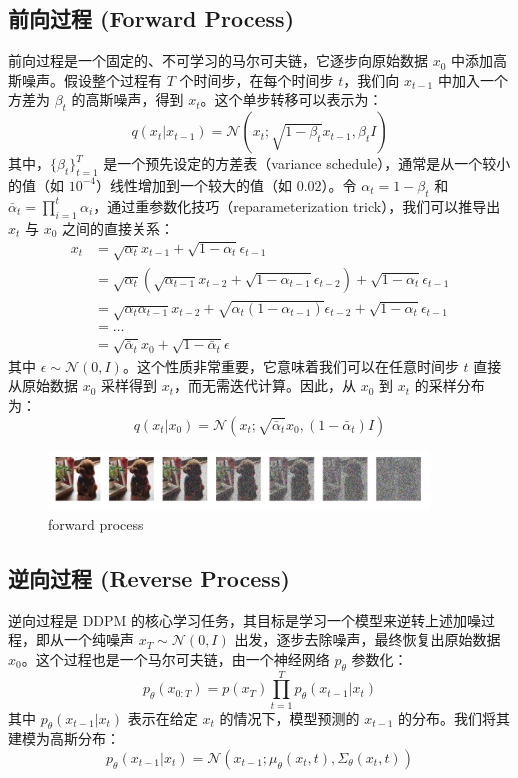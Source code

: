 \documentclass{ctexart}
\begin{document}
\subsection{前向过程 (Forward Process)}
\noindent
前向过程是一个固定的、不可学习的马尔可夫链，它逐步向原始数据 $x_0$ 中添加高斯噪声。假设整个过程有 $T$ 个时间步，在每个时间步 $t$，我们向 $x_{t-1}$ 中加入一个方差为 $\beta_t$ 的高斯噪声，得到 $x_t$。这个单步转移可以表示为：
$$ q(x_t | x_{t-1}) = \mathcal{N}(x_t; \sqrt{1 - \beta_t} x_{t-1}, \beta_t I) $$
其中，$\{\beta_t\}_{t=1}^T$ 是一个预先设定的方差表（variance schedule），通常是从一个较小的值（如 $10^{-4}$）线性增加到一个较大的值（如 $0.02$）。令 $\alpha_t = 1 - \beta_t$ 和 $\bar{\alpha}_t = \prod_{i=1}^{t} \alpha_i$，通过重参数化技巧（reparameterization trick），我们可以推导出 $x_t$ 与 $x_0$ 之间的直接关系：
\begin{align*}
    x_t &= \sqrt{\alpha_t}x_{t-1} + \sqrt{1-\alpha_t}\epsilon_{t-1} \\
    &= \sqrt{\alpha_t}(\sqrt{\alpha_{t-1}}x_{t-2} + \sqrt{1-\alpha_{t-1}}\epsilon_{t-2}) + \sqrt{1-\alpha_t}\epsilon_{t-1} \\
    &= \sqrt{\alpha_t\alpha_{t-1}}x_{t-2} + \sqrt{\alpha_t(1-\alpha_{t-1})}\epsilon_{t-2} + \sqrt{1-\alpha_t}\epsilon_{t-1} \\
    &= \dots \\
    &= \sqrt{\bar{\alpha}_t}x_0 + \sqrt{1 - \bar{\alpha}_t}\epsilon
\end{align*}
其中 $\epsilon \sim \mathcal{N}(0, I)$。这个性质非常重要，它意味着我们可以在任意时间步 $t$ 直接从原始数据 $x_0$ 采样得到 $x_t$，而无需迭代计算。因此，从 $x_0$ 到 $x_t$ 的采样分布为：
$$ q(x_t | x_0) = \mathcal{N}(x_t; \sqrt{\bar{\alpha}_t} x_0, (1 - \bar{\alpha}_t) I) $$

 \begin{figure}[H]
    \centering
    \includegraphics[width=0.9\textwidth]{forward.png}
    \caption{forward process}
    \label{fig:forward}
 \end{figure}

\subsection{逆向过程 (Reverse Process)}
\noindent
逆向过程是 DDPM 的核心学习任务，其目标是学习一个模型来逆转上述加噪过程，即从一个纯噪声 $x_T \sim \mathcal{N}(0, I)$ 出发，逐步去除噪声，最终恢复出原始数据 $x_0$。这个过程也是一个马尔可夫链，由一个神经网络 $p_\theta$ 参数化：
$$ p_\theta(x_{0:T}) = p(x_T) \prod_{t=1}^T p_\theta(x_{t-1} | x_t) $$
其中 $p_\theta(x_{t-1} | x_t)$ 表示在给定 $x_t$ 的情况下，模型预测的 $x_{t-1}$ 的分布。我们将其建模为高斯分布：
$$ p_\theta(x_{t-1} | x_t) = \mathcal{N}(x_{t-1}; \mu_\theta(x_t, t), \Sigma_\theta(x_t, t)) $$
\end{document}
